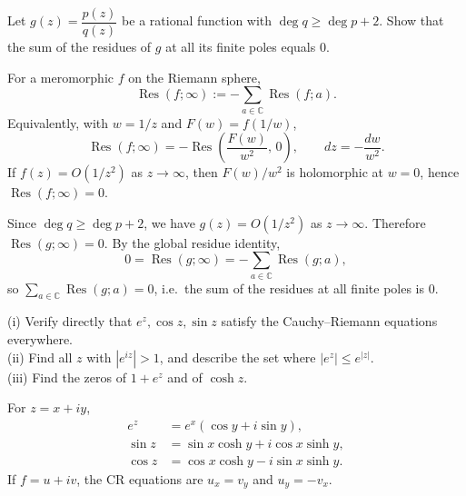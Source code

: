 \begin{problem}[CP-IV-0111]
\label{prob:cp-iv-0111}
Let $g(z)=\dfrac{p(z)}{q(z)}$ be a rational function with $\deg q\ge \deg p+2$.
Show that the sum of the residues of $g$ at all its finite poles equals $0$.

For a meromorphic $f$ on the Riemann sphere,
\[
\operatorname{Res}(f;\infty):=-\sum_{a\in\mathbb C}\operatorname{Res}(f;a).
\]
Equivalently, with $w=1/z$ and $F(w)=f(1/w)$,
\[
\operatorname{Res}(f;\infty)=-\operatorname{Res}\!\left(\frac{F(w)}{w^{2}},\,0\right),
\qquad dz=-\frac{dw}{w^{2}}.
\]
If $f(z)=O(1/z^{2})$ as $z\to\infty$, then $F(w)/w^{2}$ is holomorphic at $w=0$, hence $\operatorname{Res}(f;\infty)=0$.

\medskip
\end{problem}

\begin{solution}
Since $\deg q\ge \deg p+2$, we have $g(z)=O(1/z^{2})$ as $z\to\infty$.
Therefore $\operatorname{Res}(g;\infty)=0$. By the global residue identity,
\[
0=\operatorname{Res}(g;\infty)=-\sum_{a\in\mathbb C}\operatorname{Res}(g;a),
\]
so $\displaystyle \sum_{a\in\mathbb C}\operatorname{Res}(g;a)=0$, i.e.\ the sum of the residues at all finite poles is $0$.

\medskip
\end{solution}

\begin{problem}[CP-IV-0118]
\label{prob:cp-iv-0118}
(i) Verify directly that $e^{z}, \cos z, \sin z$ satisfy the Cauchy--Riemann equations everywhere.\\
(ii) Find all $z$ with $|e^{iz}|>1$, and describe the set where $|e^{z}|\le e^{|z|}$.\\
(iii) Find the zeros of $1+e^{z}$ and of $\cosh z$.

For $z=x+iy$,
\[
\begin{aligned}
e^{z}&=e^{x}(\cos y+i\sin y),\\
\sin z&=\sin x\cosh y+i\cos x\sinh y,\\
\cos z&=\cos x\cosh y-i\sin x\sinh y.
\end{aligned}
\]
If $f=u+iv$, the CR equations are $u_x=v_y$ and $u_y=-v_x$.
\end{problem}

